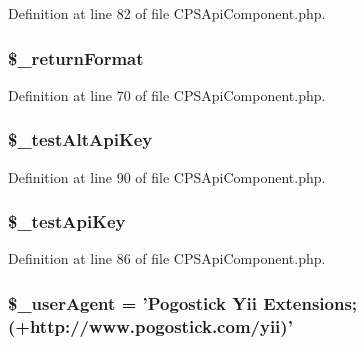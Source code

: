 Definition at line 82 of file CPSApiComponent.php.

\hypertarget{classCPSApiComponent_a7ea52a3850e51717b6268b7b9e468684}{
\subsubsection[{\$\_\-returnFormat}]{\setlength{\rightskip}{0pt plus 5cm}\$\_\-returnFormat}}
\label{classCPSApiComponent_a7ea52a3850e51717b6268b7b9e468684}


Definition at line 70 of file CPSApiComponent.php.

\hypertarget{classCPSApiComponent_a043b72271c216d07a270d5b57a17fe59}{
\subsubsection[{\$\_\-testAltApiKey}]{\setlength{\rightskip}{0pt plus 5cm}\$\_\-testAltApiKey}}
\label{classCPSApiComponent_a043b72271c216d07a270d5b57a17fe59}


Definition at line 90 of file CPSApiComponent.php.

\hypertarget{classCPSApiComponent_a539fd69c22d2f9c368e410d3542cd5a6}{
\subsubsection[{\$\_\-testApiKey}]{\setlength{\rightskip}{0pt plus 5cm}\$\_\-testApiKey}}
\label{classCPSApiComponent_a539fd69c22d2f9c368e410d3542cd5a6}


Definition at line 86 of file CPSApiComponent.php.

\hypertarget{classCPSApiComponent_a901ed68c5b7f6b758cc90b00197ca88b}{
\subsubsection[{\$\_\-userAgent}]{\setlength{\rightskip}{0pt plus 5cm}\$\_\-userAgent = 'Pogostick Yii Extensions; (+http://www.pogostick.com/yii)'}}
\label{classCPSApiComponent_a901ed68c5b7f6b758cc90b00197ca88b}


